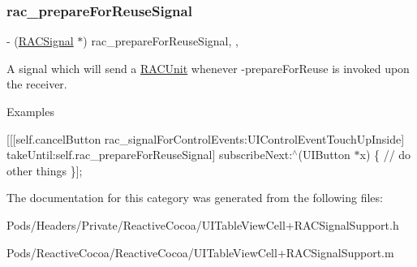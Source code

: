 \subsubsection{\texorpdfstring{rac\+\_\+prepare\+For\+Reuse\+Signal}{rac\_prepareForReuseSignal}}
{\footnotesize\ttfamily -\/ (\mbox{\hyperlink{interface_r_a_c_signal}{R\+A\+C\+Signal}} $\ast$) rac\+\_\+prepare\+For\+Reuse\+Signal\hspace{0.3cm}{\ttfamily [read]}, {\ttfamily [nonatomic]}, {\ttfamily [strong]}}

A signal which will send a \mbox{\hyperlink{interface_r_a_c_unit}{R\+A\+C\+Unit}} whenever -\/prepare\+For\+Reuse is invoked upon the receiver.

Examples

\mbox{[}\mbox{[}\mbox{[}self.\+cancel\+Button rac\+\_\+signal\+For\+Control\+Events\+:U\+I\+Control\+Event\+Touch\+Up\+Inside\mbox{]} take\+Until\+:self.\+rac\+\_\+prepare\+For\+Reuse\+Signal\mbox{]} subscribe\+Next\+:$^\wedge$(U\+I\+Button $\ast$x) \{ // do other things \}\mbox{]}; 

The documentation for this category was generated from the following files\+:\begin{DoxyCompactItemize}
\item 
Pods/\+Headers/\+Private/\+Reactive\+Cocoa/U\+I\+Table\+View\+Cell+\+R\+A\+C\+Signal\+Support.\+h\item 
Pods/\+Reactive\+Cocoa/\+Reactive\+Cocoa/U\+I\+Table\+View\+Cell+\+R\+A\+C\+Signal\+Support.\+m\end{DoxyCompactItemize}
